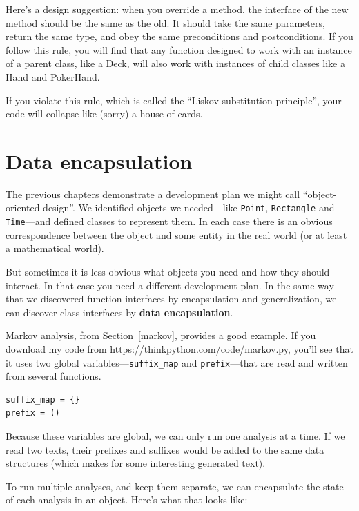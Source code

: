\documentclass[10pt]{book}
\begin{document}
Here's a design suggestion: when you override a method,
the interface of the new method should be the same as the old.  It
should take the same parameters, return the same type, and obey the
same preconditions and postconditions.  If you follow this rule, you
will find that any function designed to work with an instance of a
parent class, like a Deck, will also work with instances of child
classes like a Hand and PokerHand.

If you violate this rule, which is called the ``Liskov substitution
principle'', your code will collapse like (sorry) a house of cards.


\section{Data encapsulation}

The previous chapters demonstrate a development plan we might call
``object-oriented design''.  We identified objects we needed---like
{\tt Point}, {\tt Rectangle} and {\tt Time}---and defined classes to
represent them.  In each case there is an obvious correspondence
between the object and some entity in the real world (or at least a
mathematical world).

But sometimes it is less obvious what objects you need
and how they should interact.  In that case you need a different
development plan.  In the same way that we discovered function
interfaces by encapsulation and generalization, we can discover
class interfaces by {\bf data encapsulation}.

Markov analysis, from Section~\ref{markov}, provides a good example.
If you download my code from \url{https://thinkpython.com/code/markov.py},
you'll see that it uses two global variables---\verb"suffix_map" and
\verb"prefix"---that are read and written from several functions.

\begin{verbatim}
suffix_map = {}
prefix = ()
\end{verbatim}

Because these variables are global, we can only run one analysis at a
time.  If we read two texts, their prefixes and suffixes would be
added to the same data structures (which makes for some interesting
generated text).

To run multiple analyses, and keep them separate, we can encapsulate
the state of each analysis in an object.
Here's what that looks like:
\end{document}
